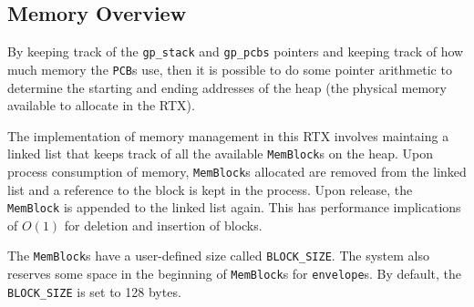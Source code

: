 \documentclass[12pt]{report}
\begin{document}
\subsection{Memory Overview}


By keeping track of the \texttt{gp_stack} and \texttt{gp_pcbs} pointers and keeping track of how much memory the \texttt{PCB}s use, then it is possible to do some pointer arithmetic to determine the starting and ending addresses of the heap (the physical memory available to allocate in the RTX).

The implementation of memory management in this RTX involves maintaing a linked list that keeps track of all the available \texttt{MemBlock}s on the heap. Upon process consumption of memory, \texttt{MemBlock}s allocated are removed from the linked list and a reference to the block is kept in the process. Upon release, the \texttt{MemBlock} is appended to the linked list again. This has performance implications of $O(1)$ for deletion and insertion of blocks.

 The \texttt{MemBlock}s have a user-defined size called \texttt{BLOCK_SIZE}. The system also reserves some space in the beginning of \texttt{MemBlock}s for \texttt{envelope}s. By default, the \texttt{BLOCK_SIZE} is set to 128 bytes.
\end{document}
